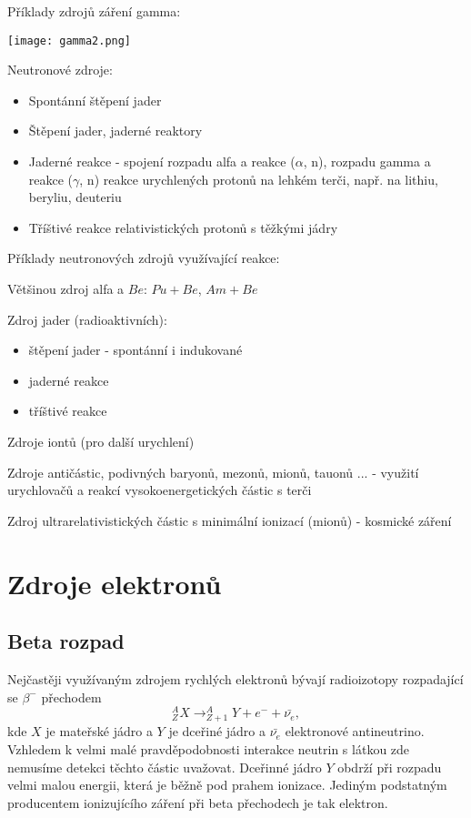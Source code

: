 \documentclass[../../main.tex]{subfiles}
\begin{document}
Příklady zdrojů záření gamma:
\begin{center}
	\texttt{[image: gamma2.png]}
\end{center}

Neutronové zdroje:
\begin{itemize}
      \item Spontánní štěpení jader
      \item Štěpení jader, jaderné reaktory
      \item Jaderné reakce - spojení rozpadu alfa a reakce ($\alpha$, n), rozpadu gamma a reakce ($\gamma$, n) reakce urychlených protonů na lehkém terči, např. na lithiu, beryliu, deuteriu
      \item Tříštivé reakce relativistických protonů s těžkými jádry 
\end{itemize}

Příklady neutronových zdrojů využívající reakce:

Většinou zdroj alfa a $Be$: $Pu+Be$, $Am+Be$

Zdroj jader (radioaktivních):
\begin{itemize}
	\item štěpení jader - spontánní i indukované
	\item jaderné reakce
	\item tříštivé reakce
\end{itemize}

Zdroje iontů (pro další urychlení)

Zdroje antičástic, podivných baryonů, mezonů, mionů, tauonů ... - využití urychlovačů a reakcí vysokoenergetických částic s terči

Zdroj ultrarelativistických částic s minimální ionizací (mionů) - kosmické záření

\section{Zdroje elektronů}

\subsection{Beta rozpad}

Nejčastěji využívaným zdrojem rychlých elektronů bývají radioizotopy rozpadající se $\beta ^-$ přechodem
\begin{equation}
^{A}_{Z}X \rightarrow ^{A}_{Z+1}Y + e^- + \bar{\nu _e},
\end{equation}
kde $X$ je mateřské jádro a $Y$ je dceřiné jádro a $\bar{\nu _e}$ elektronové antineutrino. Vzhledem k velmi malé pravděpodobnosti interakce neutrin s látkou zde nemusíme detekci těchto částic uvažovat. Dceřinné jádro $Y$ obdrží při rozpadu velmi malou energii, která je běžně pod prahem ionizace. Jediným podstatným producentem ionizujícího záření při beta přechodech je tak elektron. 
\end{document}
